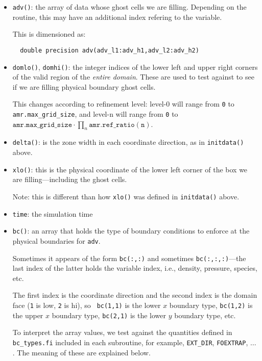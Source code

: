 \begin{itemize}
\begin{itemize}
  \item {\tt adv()}: the array of data whose ghost cells we are filling.
    Depending on the routine, this may have an additional index refering
    to the variable.
    
    This is dimensioned as:
\begin{verbatim}
  double precision adv(adv_l1:adv_h1,adv_l2:adv_h2)                             
\end{verbatim}

  \item {\tt domlo()}, {\tt domhi()}: the integer indices of the lower
    left and upper right corners of the valid region of the {\em entire
    domain}.  These are used to test against to see if we are filling
    physical boundary ghost cells.

    This changes according to refinement level: level-0 will
    range from {\tt 0} to {\tt amr.max\_grid\_size},
    and level-n will range from {\tt 0} to
    $\mathtt{amr.max\_grid\_size} \cdot \prod_n \mathtt{amr.ref\_ratio(n)}$.

  \item {\tt delta()}: is the zone width in each coordinate direction,
    as in {\tt initdata()} above.

  \item {\tt xlo()}: this is the physical coordinate of the lower
    left corner of the box we are filling---including the ghost cells.

    Note: this is different than how {\tt xlo()} was defined in
    {\tt initdata()} above.

  \item {\tt time}: the simulation time

  \item {\tt bc()}: an array that holds the type of boundary conditions
    to enforce at the physical boundaries for {\tt adv}.

    Sometimes it appears of the form {\tt bc(:,:)} and sometimes
    {\tt bc(:,:,:)}---the last index of the latter holds the variable
    index, i.e., density, pressure, species, etc.

    The first index is the coordinate direction and the second index
    is the domain face ({\tt 1} is low, {\tt 2} is hi), so {\tt
    bc(1,1)} is the lower $x$ boundary type, {\tt bc(1,2)} is
    the upper $x$ boundary type, {\tt bc(2,1)} is the lower
    $y$ boundary type, etc.

    To interpret the array values, we test against the quantities
    defined in {\tt bc\_types.fi} included in each subroutine,
    for example, {\tt EXT\_DIR}, {\tt FOEXTRAP}, $\ldots$.  The
    meaning of these are explained below.
      
  \end{itemize}
    
\end{itemize}



